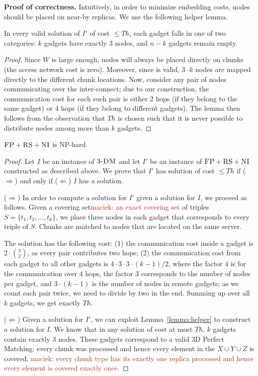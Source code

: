 \documentclass[9pt]{sigcomm-alternate}
\newcommand{\maciek}[1]{\textcolor{brown}{maciek: #1}}
\newcommand{\CC}{\textsc{NI}}
\newcommand{\FP}{\textsc{FP}}
\newcommand{\RS}{\textsc{RS}}
\newcommand{\TDM}{\textsc{3-DM}}
\newcommand{\Thr}{\ensuremath{Th}}
\begin{document}
\textbf{Proof of correctness.}
Intuitively, in order to minimize embedding costs,
nodes should be placed on near-by replicas. We use the following
helper lemma.
\begin{lemma}\label{lemma:helper}
In every valid solution of $I'$ of cost $\leq \Thr$, each gadget
falls in one of two categories:
$k$ gadgets have exactly
$3$ nodes, and $n-k$ gadgets remain empty.
\end{lemma}
\begin{proof}
Since $W$ is large enough, nodes will always be placed
directly on chunks (the access network cost is zero).
Moreover, since
is valid, $3 \cdot k$ nodes are mapped
directly to the different chunk locations.
Now, consider any pair of nodes communicating over the
inter-connect; due to our construction, the communication cost
for each such pair is either
2 hops (if they belong to the same gadget) or 4 hops (if they belong
to different gadgets).
The lemma then follows from the observation that $\Thr$
is chosen such that it is never possible to distribute nodes
among more than $k$ gadgets.
\end{proof}

\begin{theorem}
$\FP+\RS+\CC$ is NP-hard.
\end{theorem}
\begin{proof}
Let $I$ be an instance of $\TDM$ and let $I'$ be an instance of
$\FP+\RS+\CC$ constructed as described above.
We prove that $I'$ has solution of cost $\leq \Thr$ if ($\Rightarrow$) and only if
($\Leftarrow$)
$I$ has a solution.

($\Rightarrow$) In order to compute a solution
for $I'$ given a solution for $I$, we proceed as follows.
Given a covering set\maciek{an exact covering set} of triples $S = \{t_1, t_2, \ldots, t_k\}$, we place three nodes in each gadget that
corresponds to every triple of $S$. Chunks are matched to nodes that are located
on the same server.

The solution has the following cost:
(1) the communication cost inside a gadget is $2 \cdot {3 \choose 2}$,
  as every pair contributes two hops;
  (2) the communication cost from each gadget to all other gadgets is $4
  \cdot 3 \cdot 3 \cdot (k - 1) / 2$, where the factor $4$ is
  for the
  communication over $4$ hops, the factor $3$
  corresponds to the number of nodes per gadget, and
  $3 \cdot (k-1)$ is the number of nodes in remote gadgets;
  as we count each pair twice, we need to divide by two in the end.
Summing up over all $k$ gadgets, we get exactly $\Thr$.

($\Leftarrow$) Given a solution for $I'$,
we can exploit Lemma~\ref{lemma:helper} to construct a solution for $I$.
We know that in any solution of cost at most $\Thr$,
$k$ gadgets contain exactly 3 nodes. These gadgets correspond to a valid
3D Perfect Matching: every
chunk was processed and hence every element in the $X \cup Y \cup Z$ is covered. \maciek{every chunk type has its exactly one replica processed and hence every element is covered exactly once.}
\end{proof}
\end{document}
